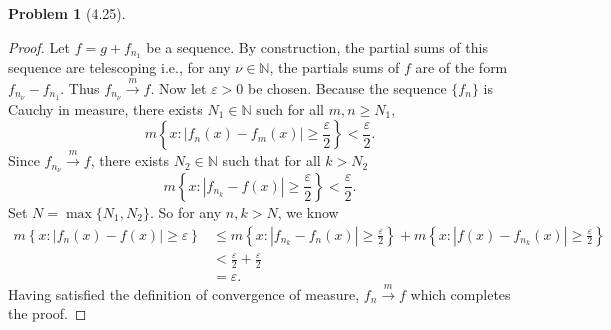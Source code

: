 \documentclass[12pt]{article}
\newcommand{\N}{\mathbb{N}}
\renewcommand{\epsilon}{\varepsilon}
\newcommand{\toM}{\overset{m}{\to}}
\theoremstyle{definition}
\newtheorem{problem}{Problem}
\begin{document}
\begin{problem}[4.25]
\begin{proof}
        Let \( f = g + f_{n_{1}} \) be a sequence. By construction, the partial sums of this sequence are telescoping i.e., for any \( \nu \in \N \), the partials sums of \(f \) are of the form \( f_{n_{\nu}} - f_{n_{1}} \). Thus \( f_{n_{\nu}} \toM f \). 
        Now let \( \epsilon > 0 \) be chosen. Because the sequence \( \{f_n\} \) is Cauchy in measure, there exists \( N_1 \in \N \) such for all \( m, n \geq N_1 \),
            \[
                m \left\{ x: |f_n(x) - f_m(x)| \geq \frac{\epsilon}{2} \right\} < \frac{\epsilon}{2}.
            \]  
        Since \( f_{n_{\nu}} \toM f \), there exists \( N_2 \in \N \) such that for all \( k > N_2 \)
            \[
                m \left\{ x: \left| f_{n_{k}} - f(x) \right| \geq \frac{\epsilon}{2} \right\} < \frac{\epsilon}{2}.
            \]
        Set \( N = \max\{ N_1, N_2 \}\). So for any \( n, k > N \), we know
            \begin{align*}
                m \left\{ x: \left| f_n(x) - f(x) \right| \geq \epsilon \right\} &\leq  m \left\{ x: \left| f_{n_{k}} - f_n(x) \right| \geq \frac{\epsilon}{2} \right\} + m \left\{ x: |f(x) - f_{n_{k}}(x)| \geq \frac{\epsilon}{2} \right\} \\
                &< \frac{\epsilon}{2} + \frac{\epsilon}{2}  \\
                &= \epsilon. 
            \end{align*}
        Having satisfied the definition of convergence of measure, \( f_n \toM f \) which completes the proof.
    \end{proof}

\end{problem}
\end{document}
